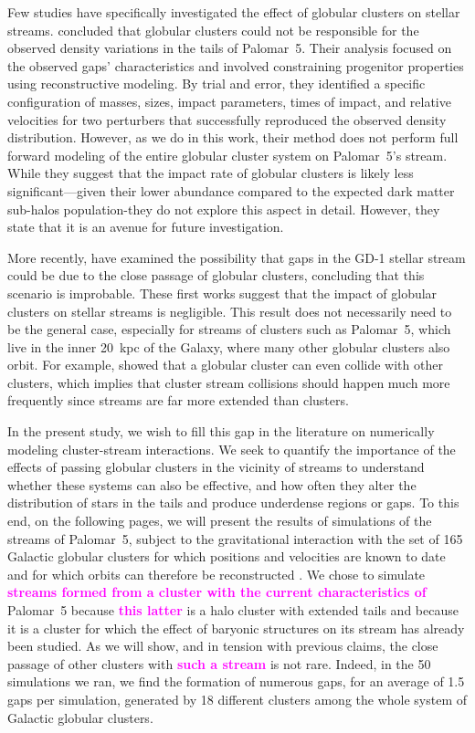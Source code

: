 \documentclass{aa}
\newcommand{\paola}[1]{\textcolor{magenta}{{#1}}}
\begin{document}
  Few studies have specifically investigated the effect of globular clusters on stellar streams. \citet{2017MNRAS.470...60E} concluded that globular clusters could not be responsible for the observed density variations in the tails of Palomar~5. Their analysis focused on the observed gaps' characteristics and involved constraining progenitor properties using reconstructive modeling. By trial and error, they identified a specific configuration of masses, sizes, impact parameters, times of impact, and relative velocities for two perturbers that successfully reproduced the observed density distribution. However, as we do in this work, their method does not perform full forward modeling of the entire globular cluster system on Palomar~5's stream. While they suggest that the impact rate of globular clusters is likely less significant—given their lower abundance compared to the expected dark matter sub-halos population-they do not explore this aspect in detail. However, they state that it is an avenue for future investigation. 
  
  More recently, \citet{2022ApJ...941..129D} have examined the possibility that gaps in the GD-1 stellar stream could be due to the close passage of globular clusters, concluding that this scenario is improbable. These first works suggest that the impact of globular clusters on stellar streams is negligible. This result does not necessarily need to be the general case, especially for streams of clusters such as Palomar~5, which live in the inner 20~kpc of the Galaxy, where many other globular clusters also orbit. For example, \citet{2023A&A...678A..69I} showed that a globular cluster can even collide with other clusters, which implies that cluster stream collisions should happen much more frequently since streams are far more extended than clusters. 
  
  In the present study, we wish to fill this gap in the literature on numerically modeling cluster-stream interactions. We seek to quantify the importance of the effects of passing globular clusters in the vicinity of streams to understand whether these systems can also be effective, and how often they alter the distribution of stars in the tails and produce underdense regions or gaps. To this end, on the following pages, we will present the results of simulations of the streams of Palomar~5, subject to the gravitational interaction with the set of 165 Galactic globular clusters for which positions and velocities are known to date and for which orbits can therefore be reconstructed \citep{2021MNRAS.505.5957B}. We chose to simulate \textbf{\paola{streams formed from a cluster with the current characteristics of}} Palomar~5 because \textbf{\paola{this latter}} is a halo cluster with extended tails and because it is a cluster for which the effect of baryonic structures on its stream has already been studied. As we will show, and in tension with previous claims, the close passage of other clusters with \textbf{\paola{such a stream}} is not rare. Indeed, in the 50 simulations we ran, we find the formation of numerous gaps, for an average of 1.5 gaps per simulation, generated by 18 different clusters among the whole system of Galactic globular clusters.
\end{document}
